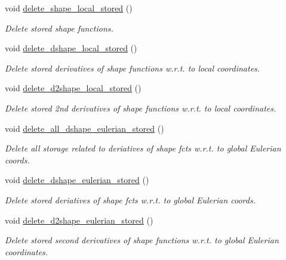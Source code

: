 \begin{DoxyCompactItemize}
void \hyperlink{classoomph_1_1StorableShapeElementBase_a4f2c2482234c2d7714e034e04ec4a271}{delete\+\_\+shape\+\_\+local\+\_\+stored} ()
\begin{DoxyCompactList}\small\item\em Delete stored shape functions. \end{DoxyCompactList}\item 
void \hyperlink{classoomph_1_1StorableShapeElementBase_a4722c398edbf54a39e9eb30758b897e9}{delete\+\_\+dshape\+\_\+local\+\_\+stored} ()
\begin{DoxyCompactList}\small\item\em Delete stored derivatives of shape functions w.\+r.\+t. to local coordinates. \end{DoxyCompactList}\item 
void \hyperlink{classoomph_1_1StorableShapeElementBase_a5fdbd08df4534edccd62ea42591a0d41}{delete\+\_\+d2shape\+\_\+local\+\_\+stored} ()
\begin{DoxyCompactList}\small\item\em Delete stored 2nd derivatives of shape functions w.\+r.\+t. to local coordinates. \end{DoxyCompactList}\item 
void \hyperlink{classoomph_1_1StorableShapeElementBase_a27c29bf7860c6504fae8c04e67db8ab1}{delete\+\_\+all\+\_\+dshape\+\_\+eulerian\+\_\+stored} ()
\begin{DoxyCompactList}\small\item\em Delete all storage related to deriatives of shape fcts w.\+r.\+t. to global Eulerian coords. \end{DoxyCompactList}\item 
void \hyperlink{classoomph_1_1StorableShapeElementBase_ac35521f80a49d09be8e318961f45ff3e}{delete\+\_\+dshape\+\_\+eulerian\+\_\+stored} ()
\begin{DoxyCompactList}\small\item\em Delete stored deriatives of shape fcts w.\+r.\+t. to global Eulerian coords. \end{DoxyCompactList}\item 
void \hyperlink{classoomph_1_1StorableShapeElementBase_a8c90dd66f8d564ecb809ed041916c96a}{delete\+\_\+d2shape\+\_\+eulerian\+\_\+stored} ()
\begin{DoxyCompactList}\small\item\em Delete stored second derivatives of shape functions w.\+r.\+t. to global Eulerian coordinates. \end{DoxyCompactList}\item 

\end{DoxyCompactItemize}
